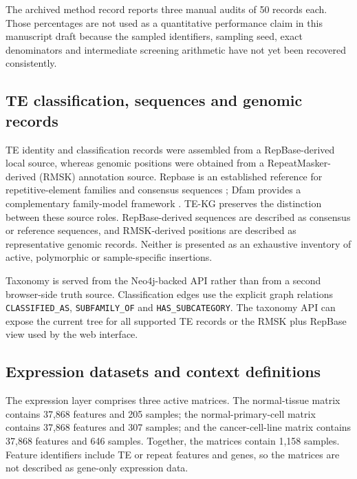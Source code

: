 The archived method record reports three manual audits of 50 records each. Those percentages are not used as a quantitative performance claim in this manuscript draft because the sampled identifiers, sampling seed, exact denominators and intermediate screening arithmetic have not yet been recovered consistently. 

\subsection{TE classification, sequences and genomic records}

TE identity and classification records were assembled from a RepBase-derived local source, whereas genomic positions were obtained from a RepeatMasker-derived (RMSK) annotation source. Repbase is an established reference for repetitive-element families and consensus sequences \citep{Bao2015Repbase,Kojima2018HumanRepbase}; Dfam provides a complementary family-model framework \citep{Wheeler2013Dfam}. TE-KG preserves the distinction between these source roles. RepBase-derived sequences are described as consensus or reference sequences, and RMSK-derived positions are described as representative genomic records. Neither is presented as an exhaustive inventory of active, polymorphic or sample-specific insertions.

Taxonomy is served from the Neo4j-backed API rather than from a second browser-side truth source. Classification edges use the explicit graph relations \texttt{CLASSIFIED\_AS}, \texttt{SUBFAMILY\_OF} and \texttt{HAS\_SUBCATEGORY}. The taxonomy API can expose the current tree for all supported TE records or the RMSK plus RepBase view used by the web interface. 

\subsection{Expression datasets and context definitions}

The expression layer comprises three active matrices. The normal-tissue matrix contains 37,868 features and 205 samples; the normal-primary-cell matrix contains 37,868 features and 307 samples; and the cancer-cell-line matrix contains 37,868 features and 646 samples. Together, the matrices contain 1,158 samples. Feature identifiers include TE or repeat features and genes, so the matrices are not described as gene-only expression data.

